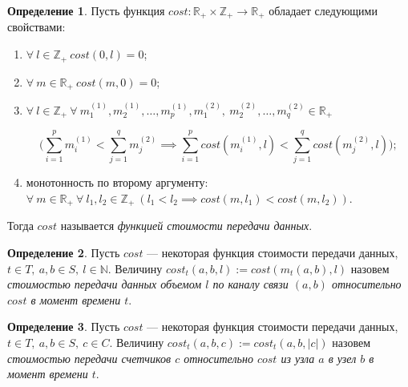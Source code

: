 \documentclass{article}
\theoremstyle{plain}
\theoremstyle{plain}
\theoremstyle{plain}
\theoremstyle{plain}
\theoremstyle{definition}
\newtheorem{definition}{Определение}[section]
\theoremstyle{remark}
\theoremstyle{plain}
\begin{document}
\begin{definition}
\label{CostFunctionDefinition}
    Пусть функция $cost : \mathbb{R}_{+} \times \mathbb{Z}_{+} \to \mathbb{R}_{+}$ обладает следующими свойствами:
    \begin{enumerate}
        \item $\forall\ l \in \mathbb{Z}_{+}\ cost(0, l) = 0$;
        
        \item $\forall\ m \in \mathbb{R}_{+}\ cost(m, 0) = 0$;
        
        
        \item $\forall\ l \in \mathbb{Z}_{+}\ \forall\ m_1^{(1)}, m_2^{(1)}, \ldots, m_p^{(1)}, m_1^{(2)},\ m_2^{(2)}, \ldots, m_q^{(2)} \in \mathbb{R}_{+}$ 
        
        \begin{equation*}
            \Big( \displaystyle \sum_{i = 1}^p m_i^{(1)} < \displaystyle \sum_{j = 1}^q m_j^{(2)} \implies \displaystyle \sum_{i = 1}^p cost(m_i^{(1)}, l) < \displaystyle \sum_{j = 1}^q cost(m_j^{(2)}, l) \Big);
        \end{equation*}
        
        \item монотонность по второму аргументу: $\forall\ m \in \mathbb{R}_{+}\ \forall\ l_1, l_2 \in \mathbb{Z}_{+}\ (l_1 < l_2 \implies cost(m, l_1) < cost(m, l_2))$.
    \end{enumerate}
    Тогда $cost$ называется \textit{функцией стоимости передачи данных}.
\end{definition}

\begin{definition}
    Пусть $cost$ --- некоторая функция стоимости передачи данных, $t \in T,\ a, b \in S,\ l \in \mathbb{N}$. Величину $cost_t(a, b, l) := cost(m_t(a, b), l)$ назовем \textit{стоимостью передачи данных объемом $l$ по каналу связи $(a, b)$ относительно $cost$ в момент времени $t$}.
\end{definition}

\begin{definition}
    Пусть $cost$ --- некоторая функция стоимости передачи данных, $t \in T,\ a, b \in S,\ c \in C$. Величину $cost_t(a, b, c) := cost_t(a, b, |c|)$ назовем \textit{стоимостью передачи счетчиков $c$ относительно $cost$ из узла $a$ в узел $b$ в момент времени $t$}.
\end{definition}
\end{document}
